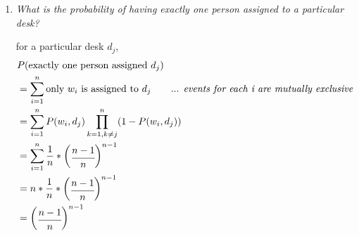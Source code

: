 \documentclass{homeworg}
\begin{document}
\begin{enumerate}[label=\alph*)]
    \item \emph{What is the probability of having exactly one person assigned to a particular desk?}
    
    for a particular desk $d_j$,
    \begin{align*}
        & P(\text{exactly one person assigned}\ d_j) \\
        & = \sum_{i = 1}^{n} \text{only } w_i \text{ is assigned to}\ d_j \qquad  \text{... \textit{events for each i are mutually exclusive}} \\
        & = \sum_{i = 1}^{n} P(w_i, d_j) \prod_{k=1, k \ne j}^n (1- P(w_i, d_j))\\
        & = \sum_{i = 1}^{n} \frac{1}{n} \ast 
            \begin{pmatrix}
                \cfrac{n-1}{n}
            \end{pmatrix}^{n-1}\\
        & = n 
            \ast  \frac{1}{n} 
            \ast 
            \begin{pmatrix}
                \cfrac{n-1}{n}
            \end{pmatrix}^{n-1}\\
        & = \begin{pmatrix}
                \cfrac{n-1}{n}
            \end{pmatrix}^{n-1}
    \end{align*}
\end{enumerate}
\end{document}
